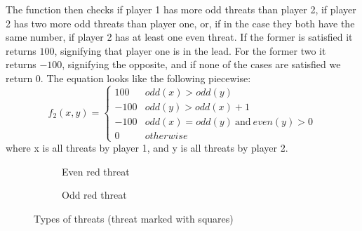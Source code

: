 \documentclass{article}
\newcommand{\rd}{\node [player, fill=red]{};}
\newcommand{\yw}{\node [player, fill=yellow] {};}
\newcommand{\gy}{\node [player, fill=white] {};}
\newcommand{\rt}{\node [threat, fill=red!50] {};}
\begin{document}
The function then checks if player 1 has more odd threats than player 2, if player 2 has two more odd threats than player one, or, if in the case they both have the same number, if player 2 has at least one even threat. If the former is satisfied it returns $100$, signifying that player one is in the lead. For the former two it returns $-100$, signifying the opposite, and if none of the cases are satisfied we return 0. The equation looks like the following piecewise:
\[ f_2(x,y)=\begin{cases} 
	100 & odd(x)>odd(y) \\
	-100 & odd(y)>odd(x)+1 \\
	-100 & odd(x)=odd(y)~\mbox{and}~even(y) > 0\\
	0 & otherwise
	\end{cases}
\]
where x is all threats by player 1, and y is all threats by player 2.
		
\begin{figure}[t]
	\centering
	\begin{subfigure}[b]{0.4\textwidth}
		\centering
		\caption{Even red threat}
		\label{threatodd}
	\end{subfigure}%
	\begin{subfigure}[b]{0.4\textwidth}
		\centering
		\caption{Odd red threat}
		\label{threateven}
	\end{subfigure}%
	\caption{Types of threats (threat marked with squares)}
	\label{threattypes}
\end{figure}
\end{document}

